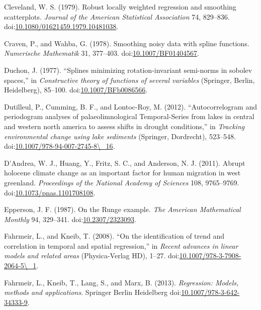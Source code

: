 \documentclass[12pt,]{article}
\begin{document}
\hypertarget{ref-Cleveland1979-vf}{}
Cleveland, W. S. (1979). Robust locally weighted regression and
smoothing scatterplots. \emph{Journal of the American Statistical
Association} 74, 829--836.
doi:\href{https://doi.org/10.1080/01621459.1979.10481038}{10.1080/01621459.1979.10481038}.

\hypertarget{ref-Craven1978-nz}{}
Craven, P., and Wahba, G. (1978). Smoothing noisy data with spline
functions. \emph{Numerische Mathematik} 31, 377--403.
doi:\href{https://doi.org/10.1007/BF01404567}{10.1007/BF01404567}.

\hypertarget{ref-Duchon1977-jr}{}
Duchon, J. (1977). ``Splines minimizing rotation-invariant semi-norms in
sobolev spaces,'' in \emph{Constructive theory of functions of several
variables} (Springer, Berlin, Heidelberg), 85--100.
doi:\href{https://doi.org/10.1007/BFb0086566}{10.1007/BFb0086566}.

\hypertarget{ref-Dutilleul2012-su}{}
Dutilleul, P., Cumming, B. F., and Lontoc-Roy, M. (2012).
``Autocorrelogram and periodogram analyses of palaeolimnological
Temporal-Series from lakes in central and western north america to
assess shifts in drought conditions,'' in \emph{Tracking environmental
change using lake sediments} (Springer, Dordrecht), 523--548.
doi:\href{https://doi.org/10.1007/978-94-007-2745-8/_16}{10.1007/978-94-007-2745-8\textbackslash{}\_16}.

\hypertarget{ref-DAndrea2011-oa}{}
D'Andrea, W. J., Huang, Y., Fritz, S. C., and Anderson, N. J. (2011).
Abrupt holocene climate change as an important factor for human
migration in west greenland. \emph{Proceedings of the National Academy
of Sciences} 108, 9765--9769.
doi:\href{https://doi.org/10.1073/pnas.1101708108}{10.1073/pnas.1101708108}.

\hypertarget{ref-Epperson1987-ui}{}
Epperson, J. F. (1987). On the Runge example. \emph{The American
Mathematical Monthly} 94, 329--341.
doi:\href{https://doi.org/10.2307/2323093}{10.2307/2323093}.

\hypertarget{ref-Fahrmeir2008-si}{}
Fahrmeir, L., and Kneib, T. (2008). ``On the identification of trend and
correlation in temporal and spatial regression,'' in \emph{Recent
advances in linear models and related areas} (Physica-Verlag HD), 1--27.
doi:\href{https://doi.org/10.1007/978-3-7908-2064-5/_1}{10.1007/978-3-7908-2064-5\textbackslash{}\_1}.

\hypertarget{ref-Fahrmeir2013-xu}{}
Fahrmeir, L., Kneib, T., Lang, S., and Marx, B. (2013).
\emph{Regression: Models, methods and applications}. Springer Berlin
Heidelberg
doi:\href{https://doi.org/10.1007/978-3-642-34333-9}{10.1007/978-3-642-34333-9}.
\end{document}
